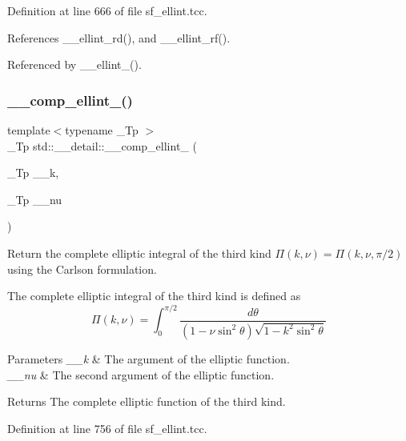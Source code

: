 Definition at line 666 of file sf\+\_\+ellint.\+tcc.



References \+\_\+\+\_\+ellint\+\_\+rd(), and \+\_\+\+\_\+ellint\+\_\+rf().



Referenced by \+\_\+\+\_\+ellint\+\_().

\mbox{\label{namespacestd_1_1____detail_a26b35b5d72366d30ac4644db8f2f8be4}} 
\subsubsection{\texorpdfstring{\+\_\+\+\_\+comp\+\_\+ellint\+\_()}{\_\_comp\_ellint\_3()}}
{\footnotesize\ttfamily template$<$typename \+\_\+\+Tp $>$ \\
\+\_\+\+Tp std\+::\+\_\+\+\_\+detail\+::\+\_\+\+\_\+comp\+\_\+ellint\+\_ (\begin{DoxyParamCaption}\item[{\+\_\+\+Tp}]{\+\_\+\+\_\+k,  }\item[{\+\_\+\+Tp}]{\+\_\+\+\_\+nu }\end{DoxyParamCaption})}



Return the complete elliptic integral of the third kind $ \Pi(k,\nu) = \Pi(k,\nu,\pi/2) $ using the Carlson formulation. 

The complete elliptic integral of the third kind is defined as \[ \Pi(k,\nu) = \int_0^{\pi/2} \frac{d\theta} {(1 - \nu \sin^2\theta)\sqrt{1 - k^2 \sin^2\theta}} \]


\begin{DoxyParams}{Parameters}
{\em \+\_\+\+\_\+k} & The argument of the elliptic function. \\
\hline
{\em \+\_\+\+\_\+nu} & The second argument of the elliptic function. \\
\hline
\end{DoxyParams}
\begin{DoxyReturn}{Returns}
The complete elliptic function of the third kind. 
\end{DoxyReturn}


Definition at line 756 of file sf\+\_\+ellint.\+tcc.



